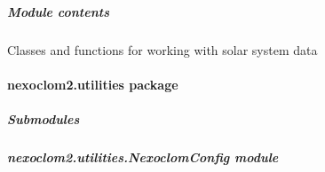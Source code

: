 \documentclass[letterpaper,10pt,english]{sphinxmanual}
\begin{document}
\subparagraph{Module contents}
\label{\detokenize{apidocs/nexoclom2.solarsystem:module-nexoclom2.solarsystem}}\label{\detokenize{apidocs/nexoclom2.solarsystem:module-contents}}
\sphinxAtStartPar
Classes and functions for working with solar system data

\sphinxstepscope


\paragraph{nexoclom2.utilities package}
\label{\detokenize{apidocs/nexoclom2.utilities:nexoclom2-utilities-package}}\label{\detokenize{apidocs/nexoclom2.utilities::doc}}

\subparagraph{Submodules}
\label{\detokenize{apidocs/nexoclom2.utilities:submodules}}

\subparagraph{nexoclom2.utilities.NexoclomConfig module}
\label{\detokenize{apidocs/nexoclom2.utilities:module-nexoclom2.utilities.NexoclomConfig}}\label{\detokenize{apidocs/nexoclom2.utilities:nexoclom2-utilities-nexoclomconfig-module}}
\end{document}
